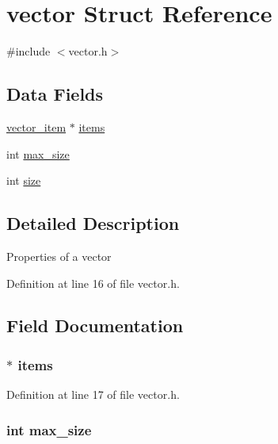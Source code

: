 \hypertarget{structvector}{\section{vector Struct Reference}
\label{structvector}
}


{\ttfamily \#include $<$vector.\+h$>$}

\subsection*{Data Fields}
\begin{DoxyCompactItemize}
\item 
\hyperlink{vector_8h_a188d83d405678bb6e5712d5a0add11c9}{vector\+\_\+item} $\ast$ \hyperlink{structvector_a72e0eddaf3010bb2c0ee97ceac437002}{items}
\item 
int \hyperlink{structvector_a98ca8117bc73d9d7520727c4ce8772e6}{max\+\_\+size}
\item 
int \hyperlink{structvector_a439227feff9d7f55384e8780cfc2eb82}{size}
\end{DoxyCompactItemize}


\subsection{Detailed Description}
Properties of a vector 

Definition at line 16 of file vector.\+h.



\subsection{Field Documentation}
\hypertarget{structvector_a72e0eddaf3010bb2c0ee97ceac437002}{
\subsubsection[{items}]{$\ast$ items}}\label{structvector_a72e0eddaf3010bb2c0ee97ceac437002}


Definition at line 17 of file vector.\+h.

\hypertarget{structvector_a98ca8117bc73d9d7520727c4ce8772e6}{
\subsubsection[{max\+\_\+size}]{\setlength{\rightskip}{0pt plus 5cm}int max\+\_\+size}}\label{structvector_a98ca8117bc73d9d7520727c4ce8772e6}


